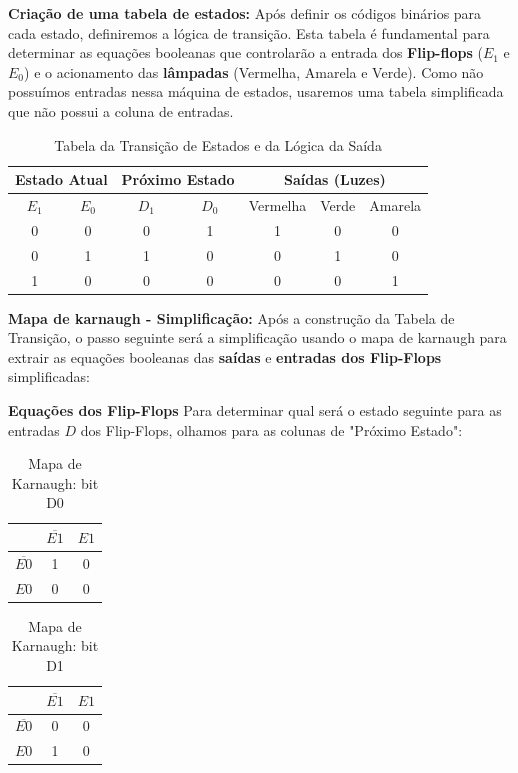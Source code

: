 \documentclass[12pt]{article}
\begin{document}
\textbf{Criação de uma tabela de estados: }
Após definir os códigos binários para cada estado, definiremos a lógica de transição. Esta tabela é fundamental para determinar as equações booleanas que controlarão a entrada dos \textbf{Flip-flops} ($E_1$ e $E_0$) e o acionamento das \textbf{lâmpadas} (Vermelha, Amarela e Verde). Como não possuímos entradas nessa máquina de estados, usaremos uma tabela simplificada que não possui a coluna de entradas.


\begin{table}[H]
    \centering
    \begin{tabular}{|c c|c c|c|c|c|}
    \hline
    \multicolumn{2}{|c|}{\textbf{Estado Atual}} & \multicolumn{2}{c|}{\textbf{Próximo Estado}} & \multicolumn{3}{c|}{\textbf{Saídas (Luzes)}} \\ \hline
    $E_1$ & $E_0$ & $D_1$ & $D_0$ & Vermelha & Verde & Amarela \\ \hline
    0 & 0 & 0 & 1 & 1 & 0 & 0 \\ 
    0 & 1 & 1 & 0 & 0 & 1 & 0 \\ 
    1 & 0 & 0 & 0 & 0 & 0 & 1 \\ 
    \hline
    \end{tabular}
    \caption{Tabela da Transição de Estados e da Lógica da Saída}
    \label{tab:transicao_estados}
\end{table}

\textbf{Mapa de karnaugh - Simplificação:}
Após a construção da Tabela de Transição, o passo seguinte será a simplificação usando o mapa de karnaugh para extrair as equações booleanas das \textbf{saídas} e \textbf{entradas dos Flip-Flops} simplificadas:

\textbf{Equações dos Flip-Flops}
Para determinar qual será o estado seguinte para as entradas $D$ dos Flip-Flops,  olhamos para as colunas de "Próximo Estado":

\begin{table}[H]
\centering
\renewcommand{\arraystretch}{1.3} %
\begin{tabular}{|c|c|c|}
\hline
 & $\overline{E1}$ & $E1$ \\
\hline
$\overline{E0}$ & 1 & 0 \\
\hline
$E0$ & 0 & 0 \\
\hline
\end{tabular}
\caption{Mapa de Karnaugh: bit D0}
\label{tab:karnaugh-D0-semaforo}
\end{table}

\begin{table}[H]
\centering
\renewcommand{\arraystretch}{1.3} %
\begin{tabular}{|c|c|c|}
\hline
 & $\overline{E1}$ & $E1$ \\
\hline
$\overline{E0}$ & 0 & 0 \\
\hline
$E0$ & 1 & 0 \\
\hline
\end{tabular}
\caption{Mapa de Karnaugh: bit D1}
\label{tab:karnaugh-D1-semaforo}
\end{table}
\end{document}
